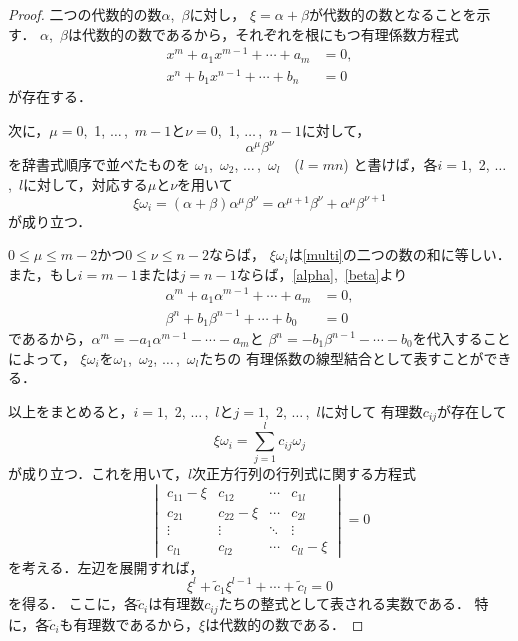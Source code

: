 \documentclass{jsarticle}
\theoremstyle{definition}
\begin{document}
\begin{proof}
二つの代数的の数$\alpha$,~$\beta$に対し，
$\xi=\alpha+\beta$が代数的の数となることを示す．
$\alpha$,~$\beta$は代数的の数であるから，それぞれを根にもつ有理係数方程式
\begin{align}
  x^m+a_1x^{m-1}+\cdots+a_m&=0,\label{alpha}\\
  x^n+b_1x^{n-1}+\cdots+b_n&=0 \label{beta}
\end{align}
が存在する．

次に，$\mu=0$,~1, $\ldots\,$,~$m-1$と$\nu=0$,~1, $\ldots\,$,~$n-1$に対して，
\begin{equation}
  \alpha^{\mu}\beta^{\nu}\label{multi}
\end{equation}
を辞書式順序で並べたものを
$\omega_1$,~$\omega_2$, $\ldots\,$,~$\omega_l$\ \ ($l=mn$)%
と書けば，各$i=1$,~2, $\ldots\,$,~$l$に対して，対応する$\mu$と$\nu$を用いて
\[
  \xi\omega_i=(\alpha+\beta)\alpha^{\mu}\beta^{\nu}
  =\alpha^{\mu+1}\beta^{\nu}+\alpha^{\mu}\beta^{\nu+1}
\]
が成り立つ．

$0\leq\mu\leq m-2$かつ$0\leq\nu\leq n-2$ならば，
$\xi\omega_i$は\eqref{multi}の二つの数の和に等しい．
また，もし$i=m-1$または$j=n-1$ならば，\eqref{alpha},~\eqref{beta}より
\begin{align*}
  \alpha^m+a_1\alpha^{m-1}+\cdots+a_m&=0,\\
  \beta^n+b_1\beta^{n-1}+\cdots+b_0&=0
\end{align*}
であるから，$\alpha^m=-a_1\alpha^{m-1}-\cdots-a_m$と
$\beta^n=-b_1\beta^{n-1}-\cdots-b_0$を代入することによって，
$\xi\omega_i$を$\omega_1$,~$\omega_2$, $\ldots\,$,~$\omega_l$たちの
有理係数の線型結合として表すことができる．

以上をまとめると，$i=1$,~2, $\ldots\,$,~$l$と$j=1$,~2, $\ldots\,$,~$l$に対して
有理数$c_{ij}$が存在して
\[
  \xi\omega_i=\sum_{j=1}^lc_{ij}\omega_j
\]
が成り立つ．これを用いて，$l$次正方行列の行列式に関する方程式
\[
  \begin{vmatrix}
    c_{11}-\xi &c_{12}     &\cdots &c_{1l}\\
    c_{21}     &c_{22}-\xi &\cdots &c_{2l}\\
    \vdots     &\vdots     &\ddots &\vdots\\
    c_{l1}     &c_{l2}     &\cdots &c_{ll}-\xi
  \end{vmatrix}
  =0
\]
を考える．左辺を展開すれば，
\[
  \xi^l+{\tilde{c}}_1\xi^{l-1}+\cdots+{\tilde{c}}_l=0
\]
を得る．
ここに，各${\tilde{c}}_i$は有理数$c_{ij}$たちの整式として表される実数である．
特に，各${\tilde{c}}_i$も有理数であるから，$\xi$は代数的の数である．
\end{proof}
\end{document}
